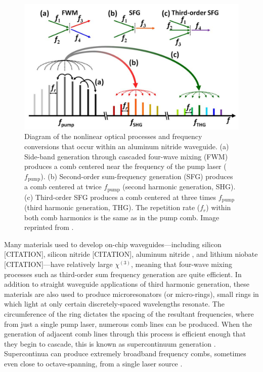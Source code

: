 \begin{figure}
    \centering
    \includegraphics[width=\textwidth]{figures-3/nonlinearity.png}
    \caption[Alumninum nitride frequency conversion diagram]{Diagram of the nonlinear optical processes and frequency conversions that occur within an aluminum nitride waveguide. (a) Side-band generation through cascaded four-wave mixing (FWM) produces a comb centered near the frequency of the pump laser ($f_\mathrm{pump}$). (b) Second-order sum-frequency generation (SFG) produces a comb centered at twice $f_\mathrm{pump}$ (second harmonic generation, SHG). (c) Third-order SFG produces a comb centered at three times $f_\mathrm{pump}$ (third harmonic generation, THG). The repetition rate ($f_r$) within both comb harmonics is the same as in the pump comb. Image reprinted from \cite{jung_green_2014}.}
    \label{fig:nonlinearity}
\end{figure}

Many materials used to develop on-chip waveguides---including silicon [CITATION], silicon nitride [CITATION], aluminum nitride \citep{jung_aluminum_2016}, and lithium niobate [CITATION]---have relatively large $\chi^{(3)}$, meaning that four-wave mixing processes such as third-order sum frequency generation are quite efficient. In addition to straight waveguide applications of third harmonic generation, these materials are also used to produce microresonators (or micro-rings), small rings in which light at only certain discretely-spaced wavelengths resonate. The circumference of the ring dictates the spacing of the resultant frequencies, where from just a single pump laser, numerous comb lines can be produced. When the generation of adjacent comb lines through this process is efficient enough that they begin to cascade, this is known as supercontinuum generation \citep{dudley_supercontinuum_2006}. Supercontinua can produce extremely broadband frequency combs, sometimes even close to octave-spanning, from a single laser source \citep{li_stably_2017, gong_near-octave_2020}.

